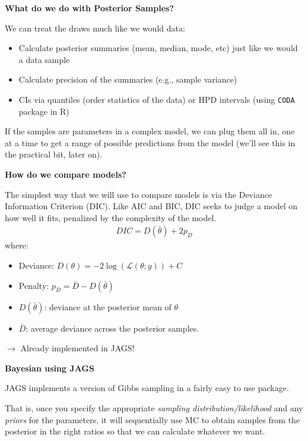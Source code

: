 \documentclass[12pt,xcolor=svgnames]{beamer}
\newcommand{\rd}{\color{red}}
\newcommand{\bl}{\color{blue}}
\newcommand{\theme}{\color{FireBrick}}
\newcommand{\sk}{\vspace{.4cm}}
\newcommand{\chap}[1]{{\theme \Large \bf #1} \sk}
\begin{document}
\begin{frame}
\chap{What do we do with Posterior Samples?}

We can treat the draws much like we would data:
\begin{itemize}
\item Calculate posterior summaries (mean, median, mode, etc) just like we would a data sample
\item Calculate precision of the summaries (e.g., sample variance)
\item CIs via quantiles (order statistics of the data) or HPD intervals (using {\tt CODA} package in R)
\end{itemize}

If the samples are parameters in a complex model, we can plug them all in, one at a time to get a range of possible predictions from the model (we'll see this in the practical bit, later on). 

\end{frame}

\begin{frame}
\chap{How do we compare models?}

The simplest way that we will use to compare models is via the {\bl Deviance Information Criterion} (DIC). Like AIC and BIC, DIC seeks to judge a model on how well it fits, penalized by the complexity of the model.
\begin{align*}
DIC = D(\bar{\theta}) + 2p_D
\end{align*}
where:
\begin{itemize}
\item Deviance: $D(\theta)=-2\log(\mathcal{L}(\theta; y)) + C$
\item Penalty: $p_D = \bar{D} -D(\bar{\theta})$
\item $D(\bar{\theta})$: deviance at the posterior mean of $\theta$
\item $\bar{D}$: average deviance across the posterior samples.
\end{itemize}
{\rd $\rightarrow$ Already implemented in JAGS!}
\end{frame}


\begin{frame}
\chap{Bayesian using JAGS}

JAGS implements a version of Gibbs sampling in a fairly easy to use package. \\

\bigskip

That is, once you specify the appropriate {\bl \it sampling distribution/likelihood} and any {\rd \it priors} for the parameters, it will sequentially use MC to obtain samples from the posterior in the right ratios so that we can calculate whatever we want.


\end{frame}
\end{document}
